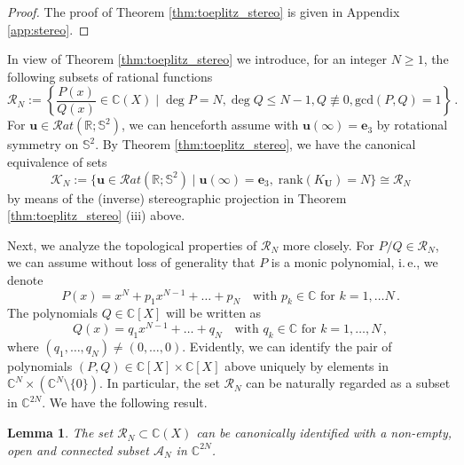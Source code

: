 \documentclass[11pt,reqno]{amsart}
\newtheorem{lem}{Lemma}[section]
\theoremstyle{definition}
\theoremstyle{remark}
\theoremstyle{remark}
\numberwithin{equation}{section}
\newcommand{\C}{\mathbb{C}}
\newcommand{\R}{\mathbb{R}}
\newcommand{\Ss}{\mathbb{S}}
\newcommand{\rank}{\mathrm{rank}}
\newcommand{\uu}{\mathbf{u}}
\newcommand{\Ub}{\mathbf{U}}
\begin{document}
\begin{proof}
The proof of Theorem \ref{thm:toeplitz_stereo} is given in Appendix \ref{app:stereo}.
\end{proof}

In view of Theorem \ref{thm:toeplitz_stereo} we introduce, for an integer $N \geq 1$, the following subsets of rational functions 
$$
\mathcal{R}_N :=  \left \{ \frac{P(x)}{Q(x)} \in \C(X) \mid \deg P = N, \deg Q \leq N-1, Q \not \equiv 0,  \mathrm{gcd}(P, Q) = 1 \right \} \, .
$$
For $\uu \in \mathcal{R}at(\R; \Ss^2)$, we can henceforth assume with $\uu(\infty) = \mathbf{e}_3$ by rotational symmetry on $\Ss^2$. By Theorem \ref{thm:toeplitz_stereo}, we have the canonical equivalence of sets
$$
\mathcal{K}_N := \{ \uu \in \mathcal{R}at(\R; \Ss^2) \mid \uu(\infty) = \mathbf{e}_3, \; \rank(K_{\Ub}) = N \} \cong \mathcal{R}_N
$$
 by means of the (inverse) stereographic projection in Theorem \ref{thm:toeplitz_stereo} (iii) above.

\medskip
Next, we analyze the topological properties of $\mathcal{R}_N$ more closely. For $P/Q \in \mathcal{R}_N$, we can assume without loss of generality that $P$ is a monic polynomial, i.\,e., we denote
$$
P(x) = x^N + p_1 x^{N-1} + \ldots + p_N \quad \mbox{with $p_k \in \C$ for $k=1, \ldots N$} \, .
$$
The polynomials $Q \in \C[X]$ will be written as
$$
Q(x) = q_1 x^{N-1} + \ldots + q_N \quad \mbox{with $q_k \in \C$ for $k=1, \ldots, N$} \, ,
$$
where $(q_1, \ldots, q_N) \neq (0,\ldots, 0)$. Evidently, we can identify the pair of polynomials $(P, Q) \in \C[X] \times \C[X]$ above uniquely by elements in $\C^N \times (\C^N \setminus \{ 0 \})$. In particular, the set $\mathcal{R}_N$ can be naturally regarded as a subset in $\C^{2N}$. We have the following result. 

\begin{lem} \label{lem:R_n}
The set $\mathcal{R}_N \subset \C(X)$ can be canonically identified with a non-empty, open and connected subset $\mathcal{A}_N$ in $\C^{2N}$. 
\end{lem}
\end{document}
